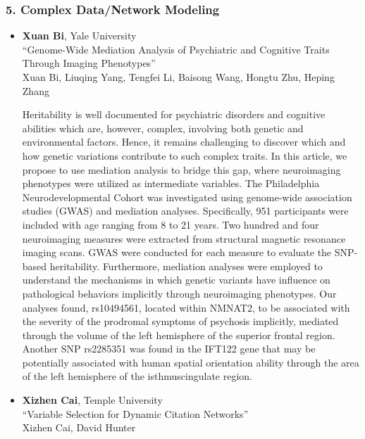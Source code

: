 \subsubsection*{5. Complex Data/Network Modeling}

\begin{itemize}
\item \textbf{Xuan Bi}, Yale University \\
``Genome-Wide Mediation Analysis of Psychiatric and Cognitive Traits Through Imaging Phenotypes'' \\
Xuan Bi, Liuqing Yang, Tengfei Li, Baisong Wang, Hongtu Zhu, Heping Zhang


Heritability is well documented for psychiatric disorders and cognitive abilities which are, however, complex, involving both genetic and environmental factors. Hence, it remains challenging to discover which and how genetic variations contribute to such complex traits. In this article, we propose to use mediation analysis to bridge this gap, where neuroimaging phenotypes were utilized as intermediate variables. The Philadelphia Neurodevelopmental Cohort was investigated using genome-wide association studies (GWAS) and mediation analyses. Specifically, 951 participants were included with age ranging from 8 to 21 years. Two hundred and four neuroimaging measures were extracted from structural magnetic resonance imaging scans. GWAS were conducted for each measure to evaluate the SNP-based heritability. Furthermore, mediation analyses were employed to understand the mechanisms in which genetic variants have influence on pathological behaviors implicitly through neuroimaging phenotypes. Our analyses found, rs10494561, located within NMNAT2, to be associated with the severity of the prodromal symptoms of psychosis implicitly, mediated through the volume of the left hemisphere of the superior frontal region. Another SNP rs2285351 was found in the IFT122 gene that may be potentially associated with human spatial orientation ability through the area of the left hemisphere of the isthmuscingulate region.

\item \textbf{Xizhen Cai}, Temple University \\
``Variable Selection for Dynamic Citation Networks'' \\
Xizhen Cai, David Hunter



\end{itemize}
